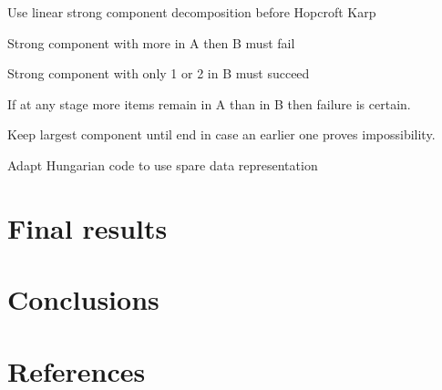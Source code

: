 \documentclass [a4paper,11pt]{article}
\begin{document}
Use linear strong component decomposition before Hopcroft Karp

Strong component with more in A then B must fail

Strong component with only 1 or 2 in B must succeed

If at any stage more items remain in A than in B then failure is certain.

Keep largest component until end in case an earlier one proves impossibility.

Adapt Hungarian code to use spare data representation


\section{Final results}
\section{Conclusions}

\section{References}


\end{document}
